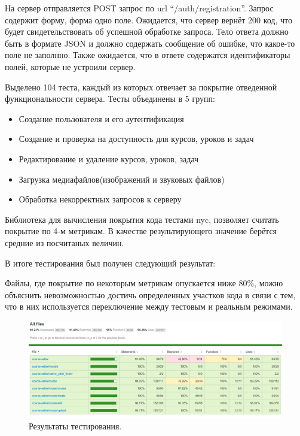 \documentclass[%
  a5paper,
  subf,
  href,
  master,
  dotsinheaders 
]{csse-fcs}
\begin{document}
На сервер отправляется POST запрос по url “/auth/registration”. Запрос содержит форму, форма одно поле. Ожидается, что сервер вернёт 200 код, что будет свидетельствовать об успешной обработке запроса. Тело ответа должно быть в формате JSON и должно содержать сообщение об ошибке, что какое-то поле не заполнно. Также ожидается, что в ответе содержатся идентификаторы полей, которые не устроили сервер.

Выделено 104 теста, каждый из которых отвечает за покрытие отведенной функциональности сервера. Тесты объединены в 5 групп: 

\begin{itemize}
	\item Создание пользователя и его аутентификация
	\item Создание и проверка на доступность для курсов, уроков и задач
	\item Редактирование и удаление курсов, уроков, задач
	\item Загрузка медиафайлов(изображений и звуковых файлов)
	\item Обработка некорректных запросов к серверу
\end{itemize}

Библиотека для вычисления покрытия кода тестами nyc, позволяет считать покрытие по 4-м метрикам. В качестве результирующего значение берётся средние из посчитаных величин.

В итоге тестирования был получен следующий результат:

Файлы, где покрытие по некоторым метрикам опускается ниже 80\%, можно объяснить невозможностью достичь определенных участков кода в связи с тем, что в них используется переключение между тестовым и реальным режимами.

\begin{figure}[H]
\includegraphics[width=1\textwidth]{img/4.png}
\captionsetup{justification=justified}
\caption{Результаты тестирования.}
\label{test_reslut}
\end{figure}
\end{document}
